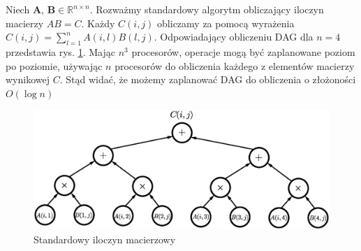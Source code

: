 \begin{przyklad}
Niech \(\mathbf{A}\), \(\mathbf{B}\in\mathbb{R}^{n\times n}\). Rozważmy standardowy algorytm obliczający iloczyn macierzy \(AB = C\). Każdy \(C(i, j)\) obliczamy za pomocą wyrażenia \(C(i, j)=\sum_{l=1}^{n}A(i,l)B(l,j)\). Odpowiadający obliczeniu DAG dla \(n=4\) przedstawia rys. \ref{fig:standard_parallel}. Mając \(n^3\) procesorów, operacje mogą być zaplanowane poziom po poziomie, używając \(n\) procesorów do obliczenia każdego z elementów macierzy wynikowej \(C\). Stąd widać, że możemy zaplanować DAG do obliczenia o złożoności \(O(\log{n})\)
\begin{figure}[H]
\centering
\includegraphics[width=34em]{images/Rys3.eps}
\caption{Standardowy iloczyn macierzowy}
\label{fig:standard_parallel}
\end{figure}

\end{przyklad}